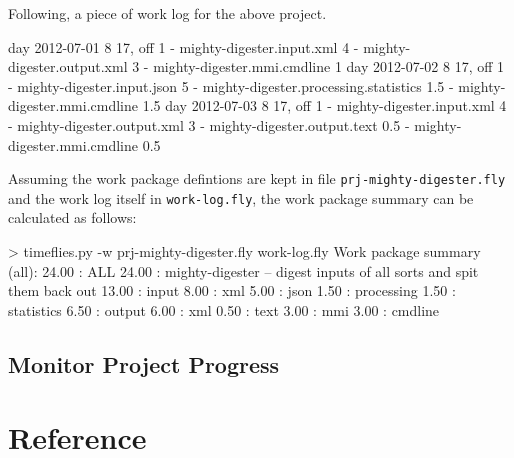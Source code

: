 \documentclass[11pt]{article}
\begin{document}
Following, a piece of work log for the above project.

\begin{inputfile}
day 2012-07-01 8 17, off 1
- mighty-digester.input.xml 4
- mighty-digester.output.xml 3
- mighty-digester.mmi.cmdline 1
day 2012-07-02 8 17, off 1
- mighty-digester.input.json 5
- mighty-digester.processing.statistics 1.5
- mighty-digester.mmi.cmdline 1.5
day 2012-07-03 8 17, off 1
- mighty-digester.input.xml 4
- mighty-digester.output.xml 3
- mighty-digester.output.text 0.5
- mighty-digester.mmi.cmdline 0.5
\end{inputfile}

Assuming the work package defintions are kept in file \verb:prj-mighty-digester.fly: and the work log itself in \verb:work-log.fly:, the work package summary can be calculated as follows:

\begin{inputfile}
> timeflies.py -w prj-mighty-digester.fly work-log.fly 
Work package summary (all):
 24.00 : ALL
     24.00 : mighty-digester -- digest inputs of all sorts and spit them back out
         13.00 : input
              8.00 : xml
              5.00 : json
          1.50 : processing
              1.50 : statistics
          6.50 : output
              6.00 : xml
              0.50 : text
          3.00 : mmi
              3.00 : cmdline
\end{inputfile}

\subsection{Monitor Project Progress}

\section{Reference}
\end{document}
